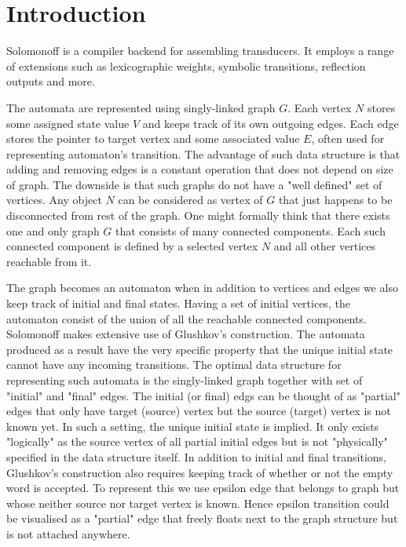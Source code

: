 \documentclass[12pt]{article}
\begin{document}
\maketitle
\lstset{
	basicstyle=\ttfamily,
	mathescape
}

 \section{Introduction}

Solomonoff is a compiler backend for assembling  transducers. 
It employs a range of extensions such as lexicographic weights, symbolic transitions, reflection outputs and more. 

The automata are represented using singly-linked graph $G$. Each vertex $N$ stores some assigned state value $V$ and keeps track of its own outgoing edges. Each edge stores the pointer to target vertex and some associated value $E$, often used for representing automaton's transition. The advantage of such data structure is that adding and removing edges is a constant operation that does not depend on size of graph. The downside is that such graphs do not have a "well defined" set of vertices. Any object $N$ can be considered as vertex of $G$ that just happens to be disconnected from rest of the graph. One might formally think that there exists one and only graph $G$ that consists of many connected components. Each such connected component is defined by a selected vertex $N$ and all other vertices  reachable from it. 

The graph becomes an automaton when in addition to vertices and edges we also keep track of initial and final states. Having a set of initial vertices, the automaton consist of the union of all the reachable connected  components. Solomonoff makes extensive use of Glushkov's construction. The automata produced as a result have the very specific property that the unique initial state cannot have any incoming transitions. The optimal data structure for representing such automata is the singly-linked graph together with set of "initial" and "final" edges.
The initial (or final) edgs can be thought of as "partial"  edges  that only have target (source) vertex but the source (target) vertex is not known yet. In such a setting, the unique initial state is implied. It only exists "logically" as the source vertex of all partial initial edges but is not "physically" specified in the data structure itself. In addition to initial and final transitions, Glushkov's construction also requires keeping track of whether or not the empty word is accepted. To represent this we use epsilon edge that belongs to graph but whose neither source nor target vertex is known. Hence epsilon transition could be visualised as a "partial" edge that freely floats next to the graph structure but is not attached anywhere. 
\end{document}
